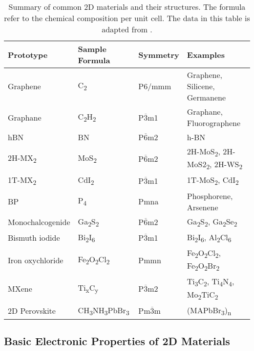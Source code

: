 \begin{table}[htbp]
  \centering
  \caption{Summary of common 2D materials and their structures. The
    formula refer to the chemical composition per unit cell. The data
    in this table is adapted from \autocite{Haastrup_2018_database}.}
  \label{tab:category-2D}
  \begin{tabularx}{1.00\textwidth}{XXXX}
    \hline
    Prototype  & Sample Formula  & Symmetry & Examples \\
    \hline
    Graphene & C\textsubscript{2} &  P6/mmm & Graphene, Silicene, Germanene \\
    Graphane & C\textsubscript{2}H\textsubscript{2} &  P$\overline{3}$m1 & Graphane, Fluoro\-graphene\\
    hBN      & BN                & P$\overline{6}$m2 & h-BN \\
    2H-MX\textsubscript{2} & MoS\textsubscript{2} & P$\overline{6}$m2 & 2H-MoS\textsubscript{2}, 2H-MoS2\textsubscript{2}, 2H-WS\textsubscript{2} \\
    1T-MX\textsubscript{2} & CdI\textsubscript{2} & P$\overline{3}$m1 & 1T-MoS\textsubscript{2}, CdI\textsubscript{2}\\
    BP & P\textsubscript{4} & Pmna & Phosphorene, Arsenene \\
    Mono\-chalcogenide & Ga\textsubscript{2}S\textsubscript{2} & P$\overline{6}$m2 & Ga\textsubscript{2}S\textsubscript{2}, Ga\textsubscript{2}Se\textsubscript{2} \\
    Bismuth iodide &  Bi\textsubscript{2}I\textsubscript{6} & P$\overline{3}$m1 & Bi\textsubscript{2}I\textsubscript{6}, Al\textsubscript{2}Cl\textsubscript{6} \\
    Iron oxychloride                &  Fe\textsubscript{2}O\textsubscript{2}Cl\textsubscript{2} & Pmmn & Fe\textsubscript{2}O\textsubscript{2}Cl\textsubscript{2}, Fe\textsubscript{2}O\textsubscript{2}Br\textsubscript{2}  \\
    MXene & Ti\textsubscript{x}C\textsubscript{y} & P$\overline{3}$m2 & Ti\textsubscript{3}C\textsubscript{2}, Ti\textsubscript{4}N\textsubscript{4}, Mo\textsubscript{2}TiC\textsubscript{2} \\
    2D Perovskite & CH\textsubscript{3}NH\textsubscript{3}PbBr\textsubscript{3} & Pm$\overline{3}$m & (MAPbBr\textsubscript{3})\textsubscript{n}\\
   \hline
\end{tabularx}
\end{table}

\subsection{Basic Electronic Properties of 2D Materials}
\label{sec:basic-electr-prop}

